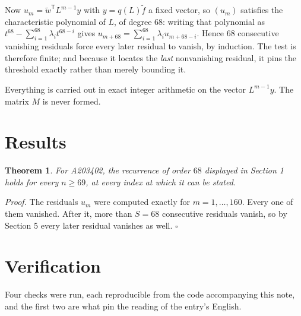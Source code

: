 \documentclass[11pt]{article}
\newtheorem{theorem}{Theorem}
\theoremstyle{definition}
\begin{document}
Now $u_m = \tilde w^{\mathsf T} L^{m-1} y$ with $y = q(L)\tilde f$ a fixed vector, so $(u_m)$ satisfies the characteristic polynomial of $L$, of degree $68$: writing that polynomial as $t^{68} - \sum_{i=1}^{68} \lambda_i t^{68-i}$ gives $u_{m+68} = \sum_{i=1}^{68} \lambda_i u_{m+68-i}$. Hence $68$ consecutive vanishing residuals force every later residual to vanish, by induction. The test is therefore finite; and because it locates the {\itshape last} nonvanishing residual, it pins the threshold exactly rather than merely bounding it.

Everything is carried out in exact integer arithmetic on the vector $L^{m-1}y$. The matrix $M$ is never formed.

\section{Results}

\begin{theorem} For A203402, the recurrence of order $68$ displayed in Section 1 holds for every $n \ge 69$, at every index at which it can be stated.\end{theorem}

{\itshape Proof.} The residuals $u_m$ were computed exactly for $m = 1,\dots,160$. Every one of them vanished. After it, more than $S = 68$ consecutive residuals vanish, so by Section 5 every later residual vanishes as well. $\square$

\section{Verification}

Four checks were run, each reproducible from the code accompanying this note, and the first two are what pin the reading of the entry's English.
\end{document}
